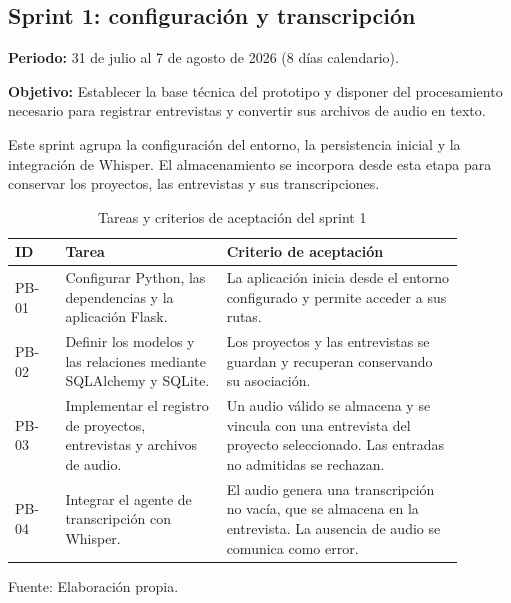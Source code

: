\subsection{Sprint 1: configuración y transcripción}

\noindent\textbf{Periodo:}
31 de julio al 7 de agosto de 2026
(8 días calendario).

\medskip
\noindent\textbf{Objetivo:}
Establecer la base técnica del prototipo y disponer
del procesamiento necesario para registrar entrevistas
y convertir sus archivos de audio en texto.

Este sprint agrupa la configuración del entorno,
la persistencia inicial y la integración de Whisper.
El almacenamiento se incorpora desde esta etapa
para conservar los proyectos, las entrevistas
y sus transcripciones.

\begin{table}[H]
    \centering
    \caption{Tareas y criterios de aceptación del sprint 1}
    \label{tab:sprint-1}
    \begingroup
    \small
    \setlength{\tabcolsep}{5pt}
    \renewcommand{\arraystretch}{1.15}
    \begin{tabular}{
        |>{\raggedright\arraybackslash}p{0.10\linewidth}
        |>{\raggedright\arraybackslash}p{0.32\linewidth}
        |>{\raggedright\arraybackslash}p{0.47\linewidth}|
    }
        \hline
        \textbf{ID} &
        \textbf{Tarea} &
        \textbf{Criterio de aceptación} \\
        \hline
        PB-01 &
        Configurar Python, las dependencias
        y la aplicación Flask. &
        La aplicación inicia desde el entorno
        configurado y permite acceder a sus rutas. \\
        \hline
        PB-02 &
        Definir los modelos y las relaciones
        mediante SQLAlchemy y SQLite. &
        Los proyectos y las entrevistas se guardan
        y recuperan conservando su asociación. \\
        \hline
        PB-03 &
        Implementar el registro de proyectos,
        entrevistas y archivos de audio. &
        Un audio válido se almacena y se vincula
        con una entrevista del proyecto seleccionado.
        Las entradas no admitidas se rechazan. \\
        \hline
        PB-04 &
        Integrar el agente de transcripción
        con Whisper. &
        El audio genera una transcripción no vacía,
        que se almacena en la entrevista.
        La ausencia de audio se comunica como error. \\
        \hline
    \end{tabular}

    \par\smallskip
    \begin{minipage}{0.95\linewidth}
        \footnotesize Fuente: Elaboración propia.
    \end{minipage}
    \endgroup
\end{table}

